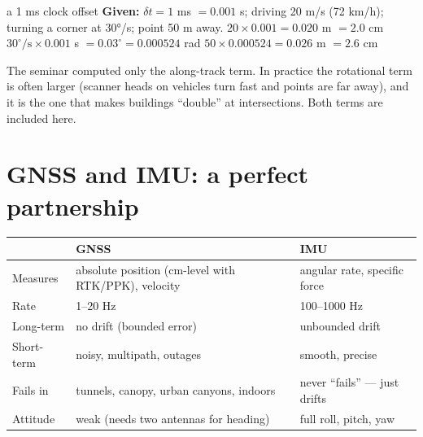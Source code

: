 \begin{worked}{a 1 ms clock offset}
\textbf{Given:} $\delta t=1$ ms $=0.001$ s; driving 20 m/s (72 km/h); turning a corner at 30°/s; point 50 m away.
 $20\times0.001=0.020$ m $=2.0$ cm
 $30^\circ/\text{s}\times0.001$ s $=0.03^\circ=0.000524$ rad
 $50\times0.000524=0.026$ m $=2.6$ cm
\end{worked}

\begin{improve}
The seminar computed only the along-track term. In practice the rotational term is often larger (scanner heads on vehicles turn fast and points are far away), and it is the one that makes buildings ``double'' at intersections. Both terms are included here.
\end{improve}

\section{GNSS and IMU: a perfect partnership}

\begin{center}\small
\renewcommand{\arraystretch}{1.2}
\begin{tabularx}{\linewidth}{lXX}\toprule
 & \textbf{GNSS} & \textbf{IMU}\\\midrule
Measures & absolute position (cm-level with RTK/PPK), velocity & angular rate, specific force\\
Rate & 1--20 Hz & 100--1000 Hz\\
Long-term & no drift (bounded error) & unbounded drift\\
Short-term & noisy, multipath, outages & smooth, precise\\
Fails in & tunnels, canopy, urban canyons, indoors & never ``fails'' --- just drifts\\
Attitude & weak (needs two antennas for heading) & full roll, pitch, yaw\\\bottomrule
\end{tabularx}\end{center}

